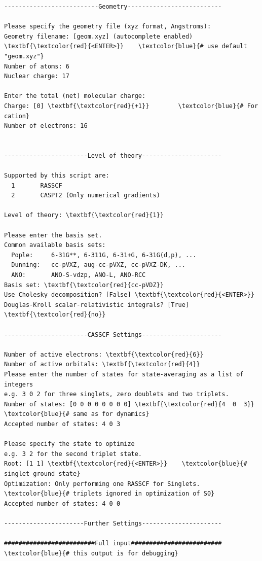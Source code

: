\documentclass[a4paper,11pt,DIV=15,openany]{scrbook}
\begin{document}
\begin{oframed}
\begin{Verbatim}[commandchars=\\\{\}]
--------------------------Geometry--------------------------

Please specify the geometry file (xyz format, Angstroms):
Geometry filename: [geom.xyz] (autocomplete enabled) \textbf{\textcolor{red}{<ENTER>}}    \textcolor{blue}{# use default "geom.xyz"}
Number of atoms: 6
Nuclear charge: 17

Enter the total (net) molecular charge:
Charge: [0] \textbf{\textcolor{red}{+1}}        \textcolor{blue}{# For cation}
Number of electrons: 16


-----------------------Level of theory----------------------

Supported by this script are:
  1       RASSCF
  2       CASPT2 (Only numerical gradients)

Level of theory: \textbf{\textcolor{red}{1}}

Please enter the basis set.
Common available basis sets:
  Pople:     6-31G**, 6-311G, 6-31+G, 6-31G(d,p), ...    
  Dunning:   cc-pVXZ, aug-cc-pVXZ, cc-pVXZ-DK, ...    
  ANO:       ANO-S-vdzp, ANO-L, ANO-RCC                   
Basis set: \textbf{\textcolor{red}{cc-pVDZ}}
Use Cholesky decomposition? [False] \textbf{\textcolor{red}{<ENTER>}}
Douglas-Kroll scalar-relativistic integrals? [True] \textbf{\textcolor{red}{no}}

-----------------------CASSCF Settings----------------------

Number of active electrons: \textbf{\textcolor{red}{6}}
Number of active orbitals: \textbf{\textcolor{red}{4}}
Please enter the number of states for state-averaging as a list of integers
e.g. 3 0 2 for three singlets, zero doublets and two triplets.
Number of states: [0 0 0 0 0 0 0 0] \textbf{\textcolor{red}{4  0  3}}    \textcolor{blue}{# same as for dynamics}
Accepted number of states: 4 0 3

Please specify the state to optimize
e.g. 3 2 for the second triplet state.
Root: [1 1] \textbf{\textcolor{red}{<ENTER>}}    \textcolor{blue}{# singlet ground state}
Optimization: Only performing one RASSCF for Singlets.  \textcolor{blue}{# triplets ignored in optimization of S0}
Accepted number of states: 4 0 0

----------------------Further Settings----------------------

#########################Full input#########################    \textcolor{blue}{# this output is for debugging}


\end{Verbatim}
\end{oframed}
\end{document}
